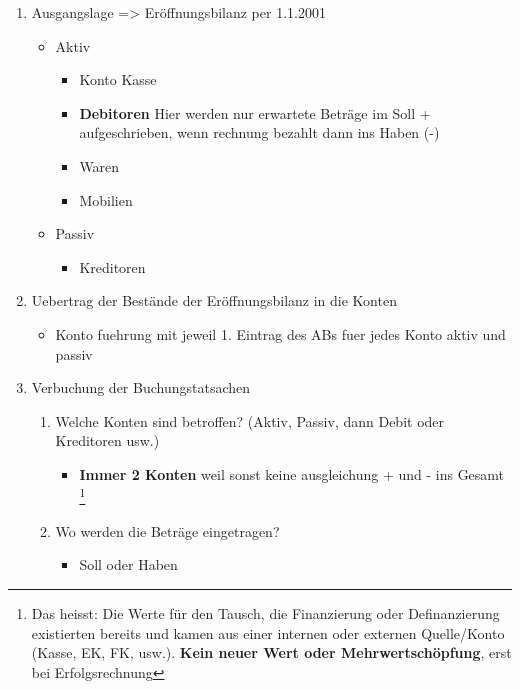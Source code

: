 \begin{enumerate}
    \item  Ausgangslage => Eröffnungsbilanz per 1.1.2001
    \begin{itemize}
        \item Aktiv
        \begin{itemize}
            \item Konto Kasse
        \item \textbf{Debitoren} 
        Hier werden nur erwartete Beträge im Soll + aufgeschrieben, wenn rechnung bezahlt dann ins Haben (-)
        \item Waren
        \item Mobilien
        \end{itemize}
        \item Passiv
        \begin{itemize}
            \item Kreditoren
        \end{itemize} 
    \end{itemize}  
    \item Uebertrag der Bestände der  Eröffnungsbilanz in die Konten
    \begin{itemize}
                \item Konto fuehrung mit jeweil 1. Eintrag des ABs fuer jedes Konto aktiv und passiv

    \end{itemize}
    \item Verbuchung der Buchungstatsachen
    \begin{enumerate}
        \item Welche Konten sind betroffen? (Aktiv, Passiv, dann Debit oder Kreditoren usw.)
        \begin{itemize}
                        \item \textbf{Immer 2 Konten} weil sonst keine ausgleichung + und - ins Gesamt \footnote{Das heisst: Die Werte für den Tausch, die Finanzierung oder Definanzierung existierten bereits und kamen aus einer internen oder externen Quelle/Konto (Kasse, EK, FK, usw.).\textbf{ Kein neuer Wert oder Mehrwertschöpfung}, erst bei Erfolgsrechnung}

        \end{itemize}
        \item Wo werden die Beträge eingetragen?
        \begin{itemize}
                        \item Soll oder Haben


\end{itemize}
\end{enumerate}
\end{enumerate}
